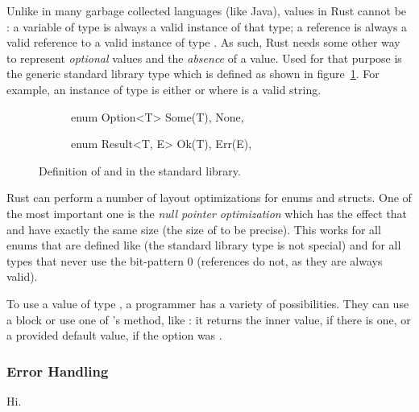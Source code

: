 Unlike in many garbage collected languages (like Java), values in Rust cannot be :
a variable of type  is always a valid instance of that type; a reference  is always a valid reference to a valid instance of type .
As such, Rust needs some other way to represent \emph{optional} values and the \emph{absence} of a value.
Used for that purpose is the generic standard library type  which is defined as shown in figure~\ref{lst:option-result-def}.
For example, an instance of type  is either  or  where  is a valid string.

\begin{figure}[t]
\centering
\begin{subfigure}{.4\textwidth}
\begin{rustcode}
enum Option<T> {
    Some(T),
    None,
}
\end{rustcode}
\end{subfigure}
\begin{subfigure}{.4\textwidth}
\begin{rustcode}
enum Result<T, E> {
    Ok(T),
    Err(E),
}
\end{rustcode}
\end{subfigure}
\caption{Definition of  and  in the standard library.}
\label{lst:option-result-def}
\end{figure}

Rust can perform a number of layout optimizations for enums and structs. One of the most important one is the \emph{null pointer optimization} which has the effect that  and  have exactly the same size (the size of  to be precise). This works for all enums that are defined like  (the standard library type is not special) and for all types that never use the bit-pattern 0 (references do not, as they are always valid).

To use a value of type , a programmer has a variety of possibilities. They can use a  block or use one of 's method, like : it returns the inner value, if there is one, or a provided default value, if the option was .


\subsubsection*{Error Handling}

Hi.




